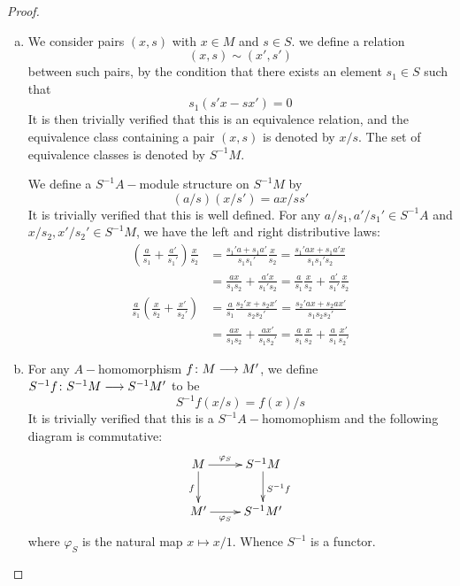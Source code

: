   \begin{proof}
    \begin{enumerate}[a)]
      \item We consider pairs $(x,s)$ with $x\in M$ and $s\in S$. we define a relation
      \begin{equation*}
        (x,s)\sim(x',s')
      \end{equation*}
      between such pairs, by the condition that there exists an element $s_1\in S$ such that
      \begin{equation*}
        s_1(s'x-sx')=0
      \end{equation*}
      It is then trivially verified that this is an equivalence relation, and the equivalence class containing a pair $(x,s)$ is denoted by $x/s$. The set of equivalence classes is denoted by $S^{-1}M$.

      We define a $S^{-1}A-$module structure on $S^{-1}M$ by
      \begin{equation*}
        (a/s)(x/s')=ax/ss'
      \end{equation*}
      It is trivially verified that this is well defined. For any $a/s_1,a'/s_1'\in S^{-1}A$ and $x/s_2,x'/s_2'\in S^{-1}M$, we have the left and right distributive laws:
      \begin{align*}
        (\frac{a}{s_1}+\frac{a'}{s_1'})\frac{x}{s_2} & = \frac{s_1'a+s_1a'}{s_1s_1'}\frac{x}{s_2} = \frac{s_1'ax+s_1a'x}{s_1s_1's_2} \\
         & = \frac{ax}{s_1s_2}+\frac{a'x}{s_1's_2} = \frac{a}{s_1}\frac{x}{s_2}+\frac{a'}{s_1'}\frac{x}{s_2} \\
        \frac{a}{s_1}(\frac{x}{s_2}+\frac{x'}{s_2'}) & = \frac{a}{s_1}\frac{s_2'x+s_2x'}{s_2s_2'} = \frac{s_2'ax+s_2ax'}{s_1s_2s_2'} \\
         & = \frac{ax}{s_1s_2}+\frac{ax'}{s_1s_2'} = \frac{a}{s_1}\frac{x}{s_2}+\frac{a}{s_1}\frac{x'}{s_2'}
      \end{align*}
      \item For any $A-$homomorphism $f\colon M\longrightarrow M'$, we define $S^{-1}f\colon S^{-1}M\longrightarrow S^{-1}M'$ to be
               \begin{equation*}
                 S^{-1}f(x/s)=f(x)/s
               \end{equation*}
               It is trivially verified that this is a $S^{-1}A-$homomophism and the following diagram is commutative:
               \begin{displaymath}
                 \xymatrix{
                    M \ar[r]^-{\varphi_S}\ar[d]_{f} & S^{-1}M\ar[d]^{S^{-1}f}       \\
                    M' \ar[r]_-{\varphi_S}  & S^{-1}M'             }
               \end{displaymath}
               where $\varphi_S$ is the natural map $x\mapsto x/1$. Whence $S^{-1}$ is a functor.


\end{enumerate}
\end{proof}
